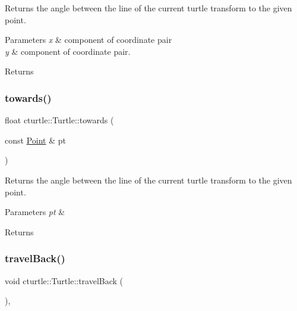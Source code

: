 Returns the angle between the line of the current turtle transform to the given point. 


\begin{DoxyParams}{Parameters}
{\em x} & component of coordinate pair \\
\hline
{\em y} & component of coordinate pair. \\
\hline
\end{DoxyParams}
\begin{DoxyReturn}{Returns}

\end{DoxyReturn}
\mbox{\label{classcturtle_1_1Turtle_ab625cf304b44417c7d3cacd65b372d37}} 
\subsubsection{\texorpdfstring{towards()}{towards()}\hspace{0.1cm}{\footnotesize\ttfamily [2/2]}}
{\footnotesize\ttfamily float cturtle\+::\+Turtle\+::towards (\begin{DoxyParamCaption}\item[{const \hyperlink{structcturtle_1_1ivec2}{Point} \&}]{pt }\end{DoxyParamCaption})\hspace{0.3cm}{\ttfamily [inline]}}



Returns the angle between the line of the current turtle transform to the given point. 


\begin{DoxyParams}{Parameters}
{\em pt} & \\
\hline
\end{DoxyParams}
\begin{DoxyReturn}{Returns}

\end{DoxyReturn}
\mbox{\label{classcturtle_1_1Turtle_a897a8629d80b75ab4c0e28c2728c8c9d}} 
\subsubsection{\texorpdfstring{travel\+Back()}{travelBack()}}
{\footnotesize\ttfamily void cturtle\+::\+Turtle\+::travel\+Back (\begin{DoxyParamCaption}{ }\end{DoxyParamCaption})\hspace{0.3cm}{\ttfamily [inline]}, {\ttfamily [protected]}}

